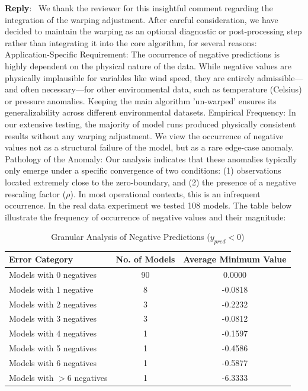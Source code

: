 \documentclass[12pt]{article}
\newcommand{\0}{\mathbf{0}}
\newcounter{reviewer}
\newenvironment{reply}
   {\medskip \noindent \begin{sf}\color{Blue}\textbf{Reply}:\  }
   {\medskip \end{sf}}
\begin{document}
\begin{reply}
We thank the reviewer for this insightful comment regarding the integration of the warping adjustment. After careful consideration, we have decided to maintain the warping as an optional diagnostic or post-processing step rather than integrating it into the core algorithm, for several reasons: Application-Specific Requirement: The occurrence of negative predictions is highly dependent on the physical nature of the data. While negative values are physically implausible for variables like wind speed, they are entirely admissible—and often necessary—for other environmental data, such as temperature (Celsius) or pressure anomalies. Keeping the main algorithm 'un-warped' ensures its generalizability across different environmental datasets. Empirical Frequency: In our extensive testing, the majority of model runs produced physically consistent results without any warping adjustment. We view the occurrence of negative values not as a structural failure of the model, but as a rare edge-case anomaly. Pathology of the Anomaly: Our analysis indicates that these anomalies typically only emerge under a specific convergence of two conditions: (1) observations located extremely close to the zero-boundary, and (2) the presence of a negative rescaling factor ($\rho$). In most operational contexts, this is an infrequent occurrence. In the real data experiment we tested 108 models. The table below illustrate the frequency of occurrence of negative values and their magnitude:

\begin{table}[h]
\centering
\caption{Granular Analysis of Negative Predictions ($y_{pred} < 0$)}
\label{tab:detailed_negatives}
\begin{tabular}{@{}lcc@{}}
\toprule
\textbf{Error Category} & \textbf{No. of Models} & \textbf{Average Minimum Value} \\ \midrule
Models with 0 negatives    & 90 & 0.0000 \\
Models with 1 negative     & 8  & -0.0818 \\
Models with 2 negatives    & 3  & -0.2232 \\
Models with 3 negatives    & 3  & -0.0812 \\
Models with 4 negatives    & 1  & -0.1597 \\
Models with 5 negatives    & 1  & -0.4586 \\
Models with 6 negatives    & 1  & -0.5877 \\
Models with $>6$ negatives & 1  & -6.3333 \\ \bottomrule
\end{tabular}
\vfill
\end{table}



\end{reply}
\end{document}
